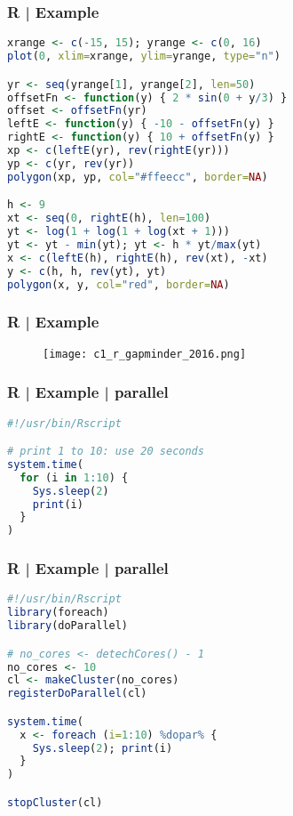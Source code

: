 \begin{frame}[fragile]
  \frametitle{R | Example}
  \vspace{-1.5em}
\begin{lstlisting}[language=R,basicstyle=\footnotesize\tt]
xrange <- c(-15, 15); yrange <- c(0, 16)
plot(0, xlim=xrange, ylim=yrange, type="n")

yr <- seq(yrange[1], yrange[2], len=50)
offsetFn <- function(y) { 2 * sin(0 + y/3) }
offset <- offsetFn(yr)
leftE <- function(y) { -10 - offsetFn(y) }
rightE <- function(y) { 10 + offsetFn(y) }
xp <- c(leftE(yr), rev(rightE(yr)))
yp <- c(yr, rev(yr))
polygon(xp, yp, col="#ffeecc", border=NA)

h <- 9
xt <- seq(0, rightE(h), len=100)
yt <- log(1 + log(1 + log(xt + 1)))
yt <- yt - min(yt); yt <- h * yt/max(yt)
x <- c(leftE(h), rightE(h), rev(xt), -xt)
y <- c(h, h, rev(yt), yt)
polygon(x, y, col="red", border=NA)
\end{lstlisting}
\end{frame}

\begin{frame}
  \frametitle{R | Example}
  \begin{figure}
    \centering
    \texttt{[image: c1\_r\_gapminder\_2016.png]}
  \end{figure}
\end{frame}

\begin{frame}[fragile]
  \frametitle{R | Example | parallel}
\begin{lstlisting}[language=R]
#!/usr/bin/Rscript

# print 1 to 10: use 20 seconds
system.time(
  for (i in 1:10) {
    Sys.sleep(2)
    print(i)
  }
)
\end{lstlisting}
\end{frame}

\begin{frame}[fragile]
  \frametitle{R | Example | parallel}
  \vspace{-0.5em}
\begin{lstlisting}[language=R]
#!/usr/bin/Rscript
library(foreach)
library(doParallel)

# no_cores <- detechCores() - 1
no_cores <- 10
cl <- makeCluster(no_cores)
registerDoParallel(cl)

system.time(
  x <- foreach (i=1:10) %dopar% {
    Sys.sleep(2); print(i)
  }
)

stopCluster(cl)
\end{lstlisting}
\end{frame}

